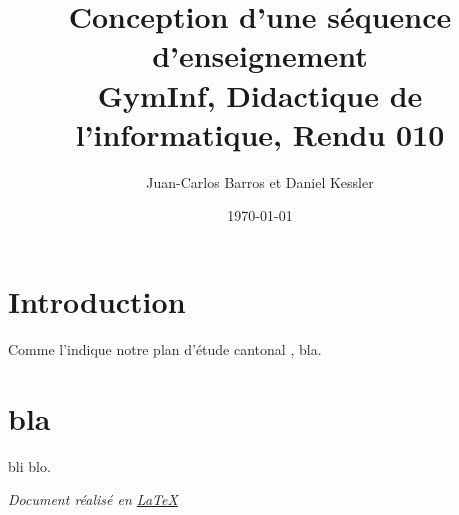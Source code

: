 \documentclass[11pt,bibliography=totoc]{scrartcl}
\author{Juan-Carlos Barros et Daniel Kessler}
\date{\today}
\title{Conception d'une séquence d'enseignement\\\medskip
  \large GymInf, Didactique de l'informatique, Rendu 010}
\begin{document}
\maketitle
\tableofcontents

\pagebreak

\section{Introduction}
Comme l'indique notre plan d'étude cantonal \cite{pecinfo}, bla.

\section{bla}
bli blo.



\vfill
\emph{Document réalisé en \href{https://www.latex-project.org/}{\LaTeX}}
\end{document}
